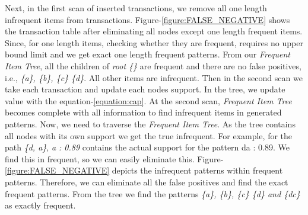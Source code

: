 \documentclass[conference]{IEEEtran}
\begin{document}

Next, in the first scan of inserted transactions, we remove all one length infrequent items from transactions. Figure-\ref{figure:FALSE_NEGATIVE} shows the transaction table after eliminating all nodes except one length frequent items. Since, for one length items, checking whether they are frequent, requires no upper bound limit and we get exact one length frequent patterns. From our \emph{Frequent Item Tree}, all the children of \emph{root \{\}} are frequent and there are no false positives, i.e., \emph{\{a\}, \{b\}, \{c\} \{d\}}. All other items are infrequent. Then in the second scan we take each transaction and update each nodes support. In the tree, we update value with the equation-\ref{equation:cap}. At the second scan, \emph{Frequent Item Tree} becomes complete with all information to find infrequent items in generated patterns. Now, we need to traverse the \emph{Frequent Item Tree}. As the tree contains all nodes with its own support we get the true infrequent. For example, for the path \emph{\{d, a\}}, \emph{a : 0.89} contains the actual support for the pattern {da : 0.89}. We find this in frequent, so we can easily eliminate this. Figure-\ref{figure:FALSE_NEGATIVE} depicts the infrequent patterns within frequent patterns. Therefore, we can eliminate all the false positives and find the exact frequent patterns. From the tree we find the patterns \emph{\{a\}, \{b\}, \{c\} \{d\} and \{dc\}} as exactly frequent.
\end{document}

